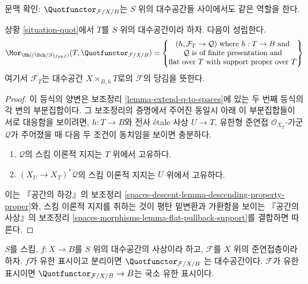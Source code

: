 \noindent
문맥 확인: $\Quotfunctor_{\mathcal{F}/X/B}$는
$S$ 위의 대수공간들 사이에서도 같은 역할을 한다.

\begin{lemma}
\label{lemma-extend-quot-to-spaces}
상황 \ref{situation-quot}에서 $T$를 $S$ 위의 대수공간이라 하자.
다음이 성립한다.
$$
\Mor_{\Sh((\Sch/S)_{fppf})}(T,  \Quotfunctor_{\mathcal{F}/X/B}) =
\left\{
\begin{matrix}
(h, \mathcal{F}_T \to \mathcal{Q}) \text{ where }
h : T \to B \text{ and}\\
\mathcal{Q}\text{ is of finite presentation and}\\
\text{flat over }T\text{ with support proper over }T
\end{matrix}
\right\}
$$
여기서 $\mathcal{F}_T$는 대수공간 $X \times_{B, h} T$로의
$\mathcal{F}$의 당김을 뜻한다.
\end{lemma}

\begin{proof}
이 등식의 양변은 보조정리 \ref{lemma-extend-q-to-spaces}에 있는
두 번째 등식의 각 변의 부분집합이다. 그 보조정리의 증명에서 주어진
동일시 아래 이 부분집합들이 서로 대응함을 보이려면, $h : T \to B$와
전사 \'etale 사상 $U \to T$, 유한형 준연접
$\mathcal{O}_{X_T}$-가군 $\mathcal{Q}$가 주어졌을 때 다음 두 조건이
동치임을 보이면 충분하다.
\begin{enumerate}
\item $\mathcal{Q}$의 스킴 이론적 지지는 $T$ 위에서 고유하다.
\item $(X_U \to X_T)^*\mathcal{Q}$의 스킴 이론적 지지는
$U$ 위에서 고유하다.
\end{enumerate}
이는 『공간의 하강』의 보조정리
\ref{spaces-descent-lemma-descending-property-proper}와, 스킴 이론적 지지를
취하는 것이 평탄 밑변환과 가환함을 보이는 『공간의 사상』의 보조정리
\ref{spaces-morphisms-lemma-flat-pullback-support}를 결합하면 따른다.
\end{proof}

\begin{proposition}
\label{proposition-quot}
$S$를 스킴, $f : X \to B$를 $S$ 위의 대수공간의 사상이라 하고,
$\mathcal{F}$를 $X$ 위의 준연접층이라 하자. $f$가 유한 표시이고 분리이면
$\Quotfunctor_{\mathcal{F}/X/B}$
는 대수공간이다. $\mathcal{F}$가 유한 표시이면
$\Quotfunctor_{\mathcal{F}/X/B} \to B$는 국소 유한 표시이다.
\end{proposition}

